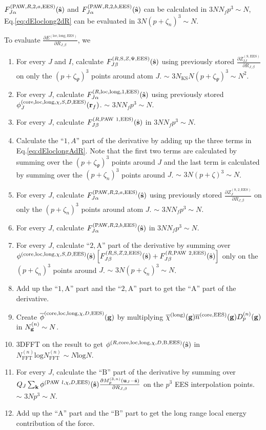 \documentclass[paper=a4, fontsize=11pt]{article} %
\numberwithin{equation}{section} %
\numberwithin{figure}{section} %
\numberwithin{table}{section} %
\newcommand{\p}{\partial}
\newcommand{\ol}{\overline}
\newcommand{\bu}{{\bf{u}}}
\newcommand{\bk}{{\bf{k}}}
\newcommand{\bs}{{\bf{s}}}
\newcommand{\bg}{{\bf{g}}}
\newcommand{\br}{{\bf{r}}}
\newcommand{\hs}{{\hat{\bf{s}}}}
\newcommand{\rS}{{\mathrm{S}}}
\newcommand{\rEES}{{\mathrm{EES}}}
\newcommand{\rcore}{{\mathrm{core}}}
\newcommand{\rlong}{{\mathrm{long}}}
\newcommand{\rP}{{\mathrm{PAW}}}
\newcommand{\rA}{{\mathrm{A}}}
\newcommand{\rB}{{\mathrm{B}}}
\newcommand{\rlo}{{\mathrm{loc}}}
\newcommand{\rl}{{\mathrm{log}}}
\newcommand{\al}{{\alpha}}
\newcommand{\RJb}{{R_{J,\beta}}}
\newcommand{\NKS}{{N_{\mathrm{KS}}}}
\newcommand{\NFFTn}{{N^{(n)}_{\mathrm{FFT}}}}
\newcommand{\Ngn}{{N^{(n)}_\bg}}
\newcommand{\Dng}{{D^{(n)}_p(\bg)}}
\newcommand{\Mn}{{M_p^{(3,n)}}}
\newcommand{\pz}{{(p+\zeta)^3}}
\newcommand{\pzp}{{(p+\zeta_{\Psi})^3}}
\newcommand{\pzn}{{(p+\zeta_n)^3}}
\begin{document}
$F_{J\al}^{(\rP,R,2,a,\rEES)}(\hat \bs)$ and $F_{J\al}^{(\rP,R,2,b,\rEES)}(\hat \bs)$ can be calculated in $3N N_f p^3 \sim N$, Eq.\eqref{eq:dEloclong2dR} can be evaluated in $3N \pzn \sim N$. 

\newpage
To evaluate $\frac{\p E^{(\rlo,\rlong,\rEES)}}{\p \RJb}$, we
\begin{enumerate}
\item For every $J$ and $I$, calculate $F_{J\beta}^{(R,\rS,Z,\Psi,\rEES)}(\hs)$ using previously stored $\frac{\p Z_{IJ}^{(\rS,\rEES)}}{\p \RJb}$ on only the $\pzp$ points around atom $J$. $\sim$ $3\NKS N \pzp \sim N^2$.
\item For every $J$, calculate $F_{J\al}^{(R,\rlo,\rlong,1,\rEES)}(\hat \bs)$  using previously stored $\phi_J^{(\rcore,\rlo,\rlong,\chi,S,D,\rEES)}(\br_f)$. $\sim$ $3N N_f p^3 \sim N$.
\item For every $J$, calculate $F_{J\beta}^{(R,\rP\ 1,\rEES)}(\hs)$ in $3 N N_f p^3\sim N$.
\item Calculate the ``$1,A$'' part of the derivative by adding up the three terms in Eq.\eqref{eq:dEloclongAdR}. Note that the first two terms are calculated by summing over the $\pzp$ points around $J$ and the last term is calculated by summing over the $\pzn$ points around $J$. $\sim$ $3N \pz \sim N$.
\item For every $J$, calculate $F_{J\al}^{(\rP,R,2,a,\rEES)}(\hat \bs)$ using previously stored $\frac{\p Z_{J}^{(\rS,2,\rEES)}}{\p \RJb}$ on only the $\pzn$ points around atom $J$. $\sim$ $3 N N_f p^3 \sim N$.
\item For every $J$, calculate $F_{J\al}^{(\rP,R,2,b,\rEES)}(\hat \bs)$ in $3 N N_f p^3 \sim N$.
\item For every $J$, calculate ``$2,\rA$'' part of the derivative by summing over \newline $\phi^{(\rcore,\rlo,\rlong,\chi,S,D,\rEES)}(\hs) \left[F_{J\beta}^{(R,\rS,Z,2,\rEES)}(\hs)+ F_{J\beta}^{(R,\rP\ 2,\rEES)}(\hs)\right]$ only on the $\pzn$ points around $J$. $\sim$ $3N\pzn \sim N$.
\item Add up the ``$1,\rA$'' part and the ``$2,\rA$'' part to get the ``$\rA$'' part of the derivative.
\item Create $\ol \phi^{(\rcore,\rlo,\rlong,\chi,D,\rEES)}(\bg)$ by multiplying $\ol \chi^{(\rlong)}(\bg) \ol n^{(\rcore,\rEES)}(\bg)\Dng$ in $\Ngn \sim N$.
\item 3DFFT on the result to get $\phi^{(R,\rcore,\rlo,\rlong,\chi,D,\rB,\rEES)}(\hs)$ in $\NFFTn \rl \NFFTn \sim N \rl N$.
\item For every $J$, calculate the ``$\rB$'' part of the derivative by summing over $Q_J \sum_{\bk} \phi^{(\rP\ l,\chi,D,\rEES)}(\hs) \frac{\p \Mn (\bu_{J}-\hat \bs)}{\p \RJb}$ on the $p^3$ EES interpolation points. $\sim$ $3N p^3 \sim N$.
\item Add up the ``$\rA$'' part and the ``$\rB$'' part to get the long range local energy contribution of the force.
\end{enumerate}
\end{document}
